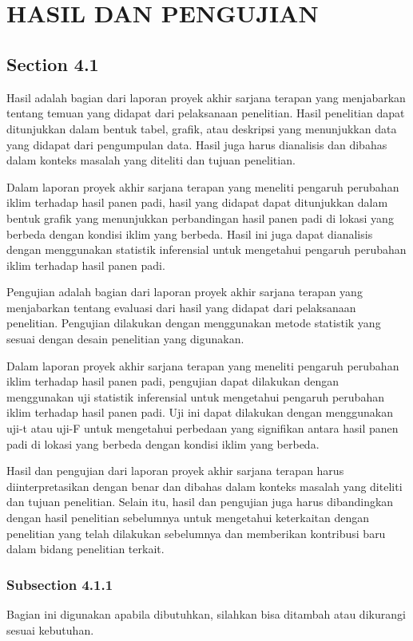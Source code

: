 \chapter[HASIL DAN PENGUJIAN]{\\ HASIL DAN PENGUJIAN}

\section{Section 4.1}
Hasil adalah bagian dari laporan proyek akhir sarjana terapan yang menjabarkan tentang temuan yang didapat dari pelaksanaan penelitian. Hasil penelitian dapat ditunjukkan dalam bentuk tabel, grafik, atau deskripsi yang menunjukkan data yang didapat dari pengumpulan data. Hasil juga harus dianalisis dan dibahas dalam konteks masalah yang diteliti dan tujuan penelitian.

Dalam laporan proyek akhir sarjana terapan yang meneliti pengaruh perubahan iklim terhadap hasil panen padi, hasil yang didapat dapat ditunjukkan dalam bentuk grafik yang menunjukkan perbandingan hasil panen padi di lokasi yang berbeda dengan kondisi iklim yang berbeda. Hasil ini juga dapat dianalisis dengan menggunakan statistik inferensial untuk mengetahui pengaruh perubahan iklim terhadap hasil panen padi.

Pengujian adalah bagian dari laporan proyek akhir sarjana terapan yang menjabarkan tentang evaluasi dari hasil yang didapat dari pelaksanaan penelitian. Pengujian dilakukan dengan menggunakan metode statistik yang sesuai dengan desain penelitian yang digunakan.

Dalam laporan proyek akhir sarjana terapan yang meneliti pengaruh perubahan iklim terhadap hasil panen padi, pengujian dapat dilakukan dengan menggunakan uji statistik inferensial untuk mengetahui pengaruh perubahan iklim terhadap hasil panen padi. Uji ini dapat dilakukan dengan menggunakan uji-t atau uji-F untuk mengetahui perbedaan yang signifikan antara hasil panen padi di lokasi yang berbeda dengan kondisi iklim yang berbeda.

Hasil dan pengujian dari laporan proyek akhir sarjana terapan harus diinterpretasikan dengan benar dan dibahas dalam konteks masalah yang diteliti dan tujuan penelitian. Selain itu, hasil dan pengujian juga harus dibandingkan dengan hasil penelitian sebelumnya untuk mengetahui keterkaitan dengan penelitian yang telah dilakukan sebelumnya dan memberikan kontribusi baru dalam bidang penelitian terkait.

\subsection{Subsection 4.1.1}
Bagian ini digunakan apabila dibutuhkan, silahkan bisa ditambah atau dikurangi sesuai kebutuhan.


